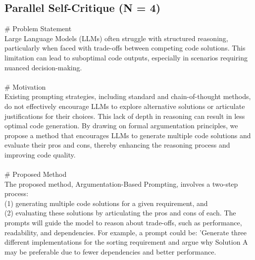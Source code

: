 \subsection{Parallel Self-Critique (N = 4)}
{\centering
\begin{tcolorbox}[
    colframe=green!50!black, 
    colback=green!10!white, 
    title=Argumentation-Based Prompting for Enhanced Code Generation in Large Language Models, 
    width=0.95\textwidth,
    boxsep=3pt
]
\# Problem Statement \\
Large Language Models (LLMs) often struggle with structured reasoning, particularly when faced with trade-offs between competing code solutions. This limitation can lead to suboptimal code outputs, especially in scenarios requiring nuanced decision-making.
\\
\\
\# Motivation \\
Existing prompting strategies, including standard and chain-of-thought methods, do not effectively encourage LLMs to explore alternative solutions or articulate justifications for their choices. This lack of depth in reasoning can result in less optimal code generation. By drawing on formal argumentation principles, we propose a method that encourages LLMs to generate multiple code solutions and evaluate their pros and cons, thereby enhancing the reasoning process and improving code quality.
\\
\\
\# Proposed Method \\
The proposed method, Argumentation-Based Prompting, involves a two-step process: \\
(1) generating multiple code solutions for a given requirement, and \\
(2) evaluating these solutions by articulating the pros and cons of each. The prompts will guide the model to reason about trade-offs, such as performance, readability, and dependencies. For example, a prompt could be: 'Generate three different implementations for the sorting requirement and argue why Solution A may be preferable due to fewer dependencies and better performance.    
\end{tcolorbox}
\par}
\clearpage

